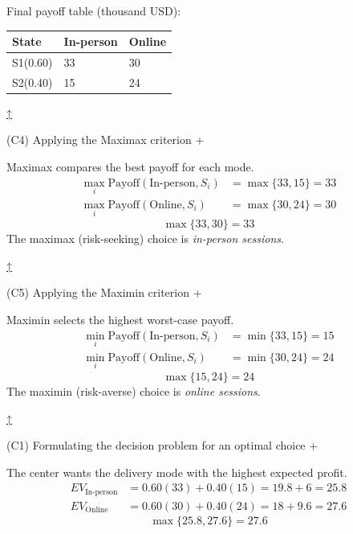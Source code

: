 \documentclass[11pt]{article}
\begin{document}
	
	Final payoff table (thousand USD):
	\begin{center}
		\begin{tabular}{lll}
			\toprule
			State & In-person & Online \\
			\midrule
			S1\newline (0.60) & 33 & 30 \\
			S2\newline (0.40) & 15 & 24 \\
			\bottomrule
		\end{tabular}
	\end{center}
	
	
	
	
	\hyperref[problem3b-criteria]{↑}
	
	
	
	
	(C4) Applying the Maximax criterion
	+
	
	
	Maximax compares the best payoff for each mode.
	\[
	\begin{aligned}
		\max_i \text{Payoff}(\text{In-person}, S_i) &= \max\{33, 15\} = 33 \\
		\max_i \text{Payoff}(\text{Online}, S_i) &= \max\{30, 24\} = 30
	\end{aligned}
	\]
	\[
	\max\{33, 30\} = 33
	\]
	The maximax (risk-seeking) choice is \emph{in-person sessions}.
	
	
	\hyperref[problem3b-criteria]{↑}
	
	
	
	
	(C5) Applying the Maximin criterion
	+
	
	
	Maximin selects the highest worst-case payoff.
	\[
	\begin{aligned}
		\min_i \text{Payoff}(\text{In-person}, S_i) &= \min\{33, 15\} = 15 \\
		\min_i \text{Payoff}(\text{Online}, S_i) &= \min\{30, 24\} = 24
	\end{aligned}
	\]
	\[
	\max\{15, 24\} = 24
	\]
	The maximin (risk-averse) choice is \emph{online sessions}.
	
	
	\hyperref[problem3b-criteria]{↑}
	
	
	
	
	(C1) Formulating the decision problem for an optimal choice
	+
	
	
	The center wants the delivery mode with the highest expected profit.
	\[
	\begin{aligned}
		EV_{\text{In-person}} &= 0.60(33) + 0.40(15) = 19.8 + 6 = 25.8 \\
		EV_{\text{Online}} &= 0.60(30) + 0.40(24) = 18 + 9.6 = 27.6
	\end{aligned}
	\]
	\[
	\max\{25.8, 27.6\} = 27.6
	\]
	
\end{document}
